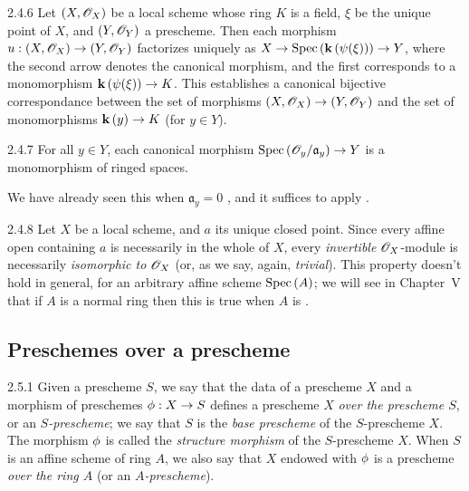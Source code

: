 \begin{envs}[Corollary]{2.4.6}
\label{cor-1.2.4.6}
Let $(X,\mathscr{O}_X)$ be a local scheme whose ring $K$ is a field, $\xi$ be the unique point of
$X$, and $(Y,\mathscr{O}_Y)$ a prescheme. Then each morphism $u:(X,\mathscr{O}_X)\to(Y,\mathscr{O}_Y)$ factorizes
uniquely as $X\to{\mathop{\mathrm{Spec}}\nolimits}\,(\mathbf{k}\,(\psi(\xi)))\to Y$, where the second arrow denotes the canonical
morphism, and the first corresponds to a monomorphism $\mathbf{k}\,(\psi(\xi))\to K$.
This establishes a canonical bijective correspondance between the set of
morphisms $(X,\mathscr{O}_X)\to (Y,\mathscr{O}_Y)$ and the set of monomorphisms $\mathbf{k}\,(y)\to K$ (for
$y\in Y$).
\end{envs}
    
\begin{envs}[Corollary]{2.4.7}
\label{cor-1.2.4.7}
For all $y\in Y$, each canonical morphism
${\mathop{\mathrm{Spec}}\nolimits}\,(\mathscr{O}_y/\mathfrak{a}_y)\to Y$ is a monomorphism of ringed spaces.
\end{envs}
    
We have already seen this when $\mathfrak{a}_y=0$ , and it suffices
to apply .
    
\begin{env}[Remark]{2.4.8}
\label{rmk-1.2.4.8}
Let $X$ be a local scheme, and $a$ its unique
closed point. Since every affine open containing $a$ is necessarily in the
whole of $X$, every \emph{invertible} $\mathscr{O}_X$-module  is
necessarily \emph{isomorphic to $\mathscr{O}_X$} (or, as we say, again, \emph{trivial}).
This property doesn't hold in general, for an arbitrary affine scheme
${\mathop{\mathrm{Spec}}\nolimits}\,(A)$; we will see in Chapter~V that if $A$ is a normal ring then this is
true when $A$ is .
\end{env}

\subsection{Preschemes over a prescheme}
\label{1-schemes-2.5}

\begin{envs}[Definition]{2.5.1}
\label{defn-1.2.5.1}
Given a prescheme $S$, we say that the data of a
prescheme $X$ and a morphism of preschemes $\phi:X\to S$ defines a
prescheme $X$ \emph{over the prescheme $S$}, or an \emph{$S$-prescheme}; we say
that $S$ is the \emph{base prescheme} of the $S$-prescheme $X$. The morphism
$\phi$ is called the \emph{structure morphism} of the $S$-prescheme $X$.
When $S$ is an affine scheme of ring $A$, we also say that $X$ endowed with
$\phi$ is a prescheme \emph{over the ring $A$} (or an \emph{$A$-prescheme}).
\end{envs}

